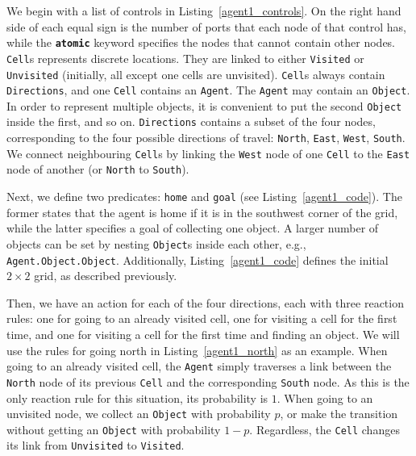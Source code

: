 \documentclass[runningheads]{llncs}
\begin{document}


We begin with a list of controls in Listing~\ref{agent1_controls}. On the right
hand side of each equal sign is the number of ports that each node of that
control has, while the \texttt{\textbf{atomic}} keyword specifies the nodes that
cannot contain other nodes. \texttt{Cell}s represents discrete locations. They
are linked to either \texttt{Visited} or \texttt{Unvisited} (initially, all
except one cells are unvisited). \texttt{Cell}s always contain
\texttt{Directions}, and one \texttt{Cell} contains an \texttt{Agent}. The
\texttt{Agent} may contain an \texttt{Object}. In order to represent multiple
objects, it is convenient to put the second \texttt{Object} inside the first,
and so on. \texttt{Directions} contains a subset of the four nodes,
corresponding to the four possible directions of travel: \texttt{North},
\texttt{East}, \texttt{West}, \texttt{South}. We connect neighbouring
\texttt{Cell}s by linking the \texttt{West} node of one \texttt{Cell} to the
\texttt{East} node of another (or \texttt{North} to \texttt{South}).



Next, we define two predicates: \texttt{home} and \texttt{goal} (see
Listing~\ref{agent1_code}). The former states that the agent is home if it is in
the southwest corner of the grid, while the latter specifies a goal of
collecting one object. A larger number of objects can be set by nesting
\texttt{Object}s inside each other, e.g., \texttt{Agent.Object.Object}.
Additionally, Listing~\ref{agent1_code} defines the initial $2 \times 2$ grid,
as described previously.



Then, we have an action for each of the four directions, each with three
reaction rules: one for going to an already visited cell, one for visiting a
cell for the first time, and one for visiting a cell for the first time and
finding an object. We will use the rules for going north in
Listing~\ref{agent1_north} as an example. When going to an already visited cell,
the \texttt{Agent} simply traverses a link between the \texttt{North} node of
its previous \texttt{Cell} and the corresponding \texttt{South} node. As this is
the only reaction rule for this situation, its probability is $1$. When going to
an unvisited node, we collect an \texttt{Object} with probability $p$, or make
the transition without getting an \texttt{Object} with probability $1-p$.
Regardless, the \texttt{Cell} changes its link from \texttt{Unvisited} to
\texttt{Visited}.
\end{document}
